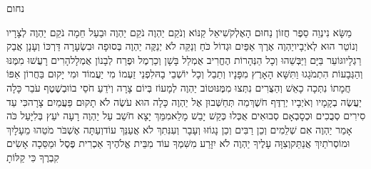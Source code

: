 \documentclass[../main/main.tex]{subfiles}
\begin{document}
\Incipit{}נחום\par
\vspace{\afterchapskip}
\RTLmulticolcolumns
\begin{multicols}{\ncols}
מַשָּׂא נִינְוֵה סֵפֶר חֲזוֹן נַחוּם הָאֶלְקֹשִׁי\PreVerseSpace{}אֵל קַנּוֹא וְנֹקֵם יַהְוֶה נֹקֵם יַהְוֶה וּבַעַל חֵמָה נֹקֵם יַהְוֶה לְצָרָיו וְנוֹטֵר הוּא לְאֹיְבָיו\PreVerseSpace{}יַהְוֶה אֶרֶךְ אַפַּיִם וּגְדוֹל כֹּחַ וְנַקֵּה לֹא יְנַקֶּה יַהְוֶה בְּסוּפָה וּבִשְׂעָרָה דַּרְכּוֹ וְעָנָן אֲבַק רַגְלָיו\PreVerseSpace{}גּוֹעֵר בַּיָּם וַיַּבְּשֵׁהוּ וְכָל הַנְּהָרוֹת הֶחֱרִיב אֻמְלַל בָּשָׁן וְכַרְמֶל וּפֶרַח לְבָנוֹן אֻמְלָל\PreVerseSpace{}הָרִים רָעֲשׁוּ מִמֶּנּוּ וְהַגְּבָעוֹת הִתְמֹגָגוּ וַתִּשָּׁא\SubEnd{} הָאָרֶץ מִפָּנָיו וְתֵבֵל וְכָל יוֹשְׁבֵי בָהּ\PreVerseSpace{}לִפְנֵי זַעְמוֹ מִי יַעֲמוֹד וּמִי יָקוּם בַּחֲרוֹן אַפּוֹ חֲמָתוֹ נִתְּכָה כָאֵשׁ וְהַצֻּרִים נִתְּצוּ מִמֶּנּוּ\PreVerseSpace{}טוֹב יַהְוֶה לְמָעוֹז בְּיוֹם צָרָה וְיֹדֵעַ חֹסֵי בוֹ\PreVerseSpace{}וּבְשֶׁטֶף עֹבֵר כָּלָה יַעֲשֶׂה בְקָמָיו\SubEnd{} וְאֹיְבָיו יְרַדֶּף חֹשֶׁךְ\PreVerseSpace{}מַה תְּחַשְּׁבוּן אֶל יַהְוֶה כָּלָה הוּא עֹשֶׂה לֹא תָקוּם פַּעֲמַיִם צָרָה\PreVerseSpace{}כִּי עַד סִירִים סְבֻכִים וּכְסָבְאָם סְבוּאִים אֻכְּלוּ כְּקַשׁ יָבֵשׁ מָלֵא\PreVerseSpace{}מִמֵּךְ יָצָא חֹשֵׁב עַל יַהְוֶה רָעָה יֹעֵץ בְּלִיָּעַל \ClosedSection{}כֹּה אָמַר יַהְוֶה אִם שְׁלֵמִים וְכֵן רַבִּים וְכֵן נָגוֹזּוּ וְעָבָר וְעִנִּתִךְ לֹא אֲעַנֵּךְ עוֹד\PreVerseSpace{}וְעַתָּה אֶשְׁבֹּר מֹטֵהוּ מֵעָלָיִךְ וּמוֹסְרֹתַיִךְ אֲנַתֵּק\PreVerseSpace{}וְצִוָּה עָלֶיךָ יַהְוֶה לֹא יִזָּרַע מִשִּׁמְךָ עוֹד מִבֵּית אֱלֹהֶיךָ אַכְרִית פֶּסֶל וּמַסֵּכָה אָשִׂים קִבְרֶךָ כִּי קַלּוֹתָ\OpenSection{}\par

\end{multicols}
\end{document}
